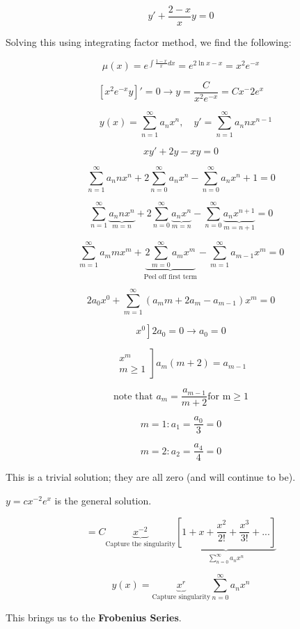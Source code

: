 \documentclass{article}
\begin{document}
$$ y' + \frac{2-x}{x} y = 0$$

Solving this using integrating factor method, we find the following:

$$\mu(x) = e^{\int \frac{1-x}{x} dx} = e^{2 \ln x - x} = x^2 e^{-x}$$

$$\left[x^2 e^{-x} y \right]' = 0 \rightarrow y = \frac{C}{x^2 e^{-x}} = C x^-2 e^x$$


$$\quad y(x) = \sum_{n = 1}^\infty a_n x^n, \quad y' = \sum_{n=1}^\infty a_n n x^{n-1}$$

$$xy' + 2y - xy = 0$$

$$\sum_{n = 1}^{\infty} a_n n x^n + 2 \sum_{n = 0}^{\infty} a_n x^n - \sum_{n = 0}^{\infty} a_n x^n+1 = 0$$


$$\sum_{n=1}^\infty \underbrace{a_n n x^n}_{m=n} + 2 \sum_{n=0}^\infty \underbrace{a_n x^n}_{m=n} - \sum_{n=0}^\infty \underbrace{a_n x^{n+1}}_{m = n+1} = 0$$

$$\sum_{m=1}^\infty a_m m x^m + \underbrace{2 \sum_{m=0}^\infty a_m x^m}_{\text{Peel off first term}} - \sum_{m=1}^\infty a_{m-1} x^m = 0$$

$$2 a_0 x^0 + \sum_{m=1}^\infty \left(a_m m + 2 a_m - a_{m-1} \right) x^m = 0$$

$$\left. x^0 \right] 2 a_0 = 0 \longrightarrow a_0 = 0$$

$$ \left. \begin{matrix} x^m \\ m \geq 1 \end{matrix} \right] a_m (m+2) = a_{m-1}$$

$$\text{note that } a_m = \frac{a_{m-1}}{m+2} \text{for m} \geq 1$$

$$m = 1: a_1 = \frac{a_0}{3} = 0$$

$$m = 2: a_2 = \frac{a_4}{4} = 0$$

This is a trivial solution; they are all zero (and will continue to be). 

$y = c x^{-2} e^x$ is the general solution. 

$$ = C \underbrace{x^{-2}}_{\text{Capture the singularity}} \underbrace{\left[ 1 + x + \frac{x^2}{2!} + \frac{x^3}{3!} + ... \right]}_{\sum_{n = 0}^{\infty} a_n x^n}$$

$$ y(x) = \underbrace{x^r}_{\text{Capture singularity}} \sum_{n = 0}^{\infty} a_n x^n$$

This brings us to the \textbf{Frobenius Series}. 
\end{document}
